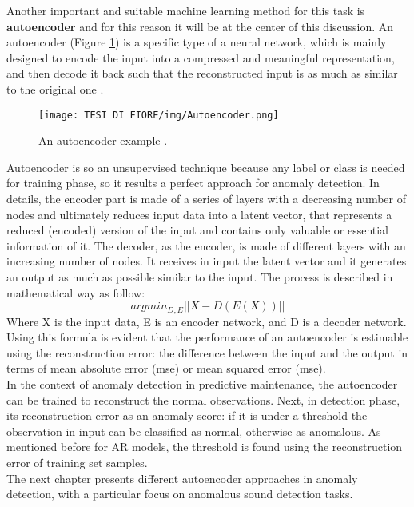 Another important and suitable machine learning method for this task is \textbf{autoencoder} and for this reason it will be at the center of this discussion. 
An autoencoder (Figure \ref{autoencoder_image}) is a specific type of a neural network, which is mainly designed to encode the input into a compressed and meaningful representation, and then decode it back such that the reconstructed input is as much as similar to the original one \cite{10Autoencoders}.\\
\begin{figure}[ht]
\texttt{[image: TESI DI FIORE/img/Autoencoder.png]}
\centering
\caption{An autoencoder example \cite{10Autoencoders}.}
\label{autoencoder_image}
\end{figure}
Autoencoder is so an unsupervised technique because any label or class is needed for training phase, so it results a perfect approach for anomaly detection. In details, the encoder part is made of a series of layers with a decreasing number of nodes and ultimately reduces input data into a latent vector, that represents a reduced (encoded) version of the input and contains only valuable or essential information of it. The decoder, as the encoder, is made of different layers with an increasing number of nodes. It receives in input the latent vector and it generates an output as much as possible similar to the input. The process is described in mathematical way as follow:
\[argmin_{D,E} || X - D(E(X))||\]
Where X is the input data, E is an encoder network, and D is a decoder network. Using this formula is evident that the performance of an autoencoder is estimable using the reconstruction error: the difference between the input and the output in terms of mean absolute error (mse) or mean squared error (mse).\\
In the context of anomaly detection in predictive maintenance, the autoencoder can be trained to reconstruct the normal observations. Next, in detection phase, its reconstruction error as an anomaly score: if it is under a threshold the observation in input can be classified as normal, otherwise as anomalous. As mentioned before for AR models, the threshold is found using the reconstruction error of training set samples.\\
The next chapter presents different autoencoder approaches in anomaly detection, with a particular focus on anomalous sound detection tasks.

